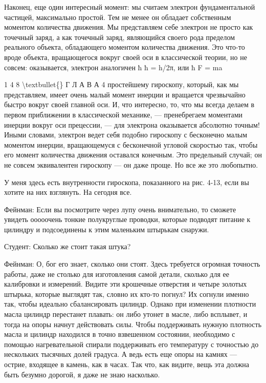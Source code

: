 \documentclass[10pt,oneside]{article}
\newcommand{\TipsSubsection}[1]{\par\vspace{6bp}{\normalsize\bfseries #1\par}\vspace{2bp}}
\begin{document}
Наконец, еще один интересный момент: мы считаем электрон фундаментальной частицей, максимально простой. Тем не менее он обладает собственным моментом количества движения. Мы представляем себе электрон не просто как точечный заряд, а как точечный заряд, являющийся своего рода пределом реального объекта, обладающего моментом количества движения. Это что-то вроде объекта, вращающегося вокруг своей оси в классической теории, но не совсем: оказывается, электрон аналогичен ħ ħ = h/2π, или ħ F = ma\par

1 4 8 \textbackslash{}textbullet\{\} Г Л А В А  4 простейшему гироскопу, который, как мы представляем, имеет очень малый момент инерции и вращается чрезвычайно быстро вокруг своей главной оси. И, что интересно, то, что мы всегда делаем в первом приближении в классической механике, --- пренебрегаем моментами инерции вокруг оси прецессии, --- для электрона оказывается абсолютно точным! Иными словами, электрон ведет себя подобно гироскопу с бесконечно малым моментом инерции, вращающемуся с бесконечной угловой скоростью так, чтобы его момент количества движения оставался конечным. Это предельный случай; он не совсем эквивалентен гироскопу --- он даже проще. Но все же это любопытно.\par

У меня здесь есть внутренности гироскопа, показанного на рис. 4-13, если вы хотите на них взглянуть. На сегодня все.\par

\TipsSubsection{4-14 После лекции}

Фейнман: Если вы посмотрите через лупу очень внимательно, то сможете увидеть ооооочень тонкие полукруглые проводки, которые подводят питание к цилиндру и подсоединены к этим маленьким штырькам снаружи.\par

Студент: Сколько же стоит такая штука?\par

Фейнман: О, бог его знает, сколько они стоят. Здесь требуется огромная точность работы, даже не столько для изготовления самой детали, сколько для ее калибровки и измерений. Видите эти крошечные отверстия и четыре золотых штырька, которые выглядят так, словно их кто-то погнул? Их согнули именно так, чтобы идеально сбалансировать цилиндр. Однако при изменении плотности масла цилиндр перестанет плавать: он либо утонет в масле, либо всплывет, и тогда на опоры начнут действовать силы. Чтобы поддерживать нужную плотность масла и цилиндр находился в точно взвешенном состоянии, необходимо с помощью нагревательной спирали поддерживать его температуру с точностью до нескольких тысячных долей градуса. А ведь есть еще опоры на камнях --- острие, входящее в камень, как в часах. Так что, как видите, вещь эта должна быть безумно дорогой, я даже не знаю насколько.\par
\end{document}

